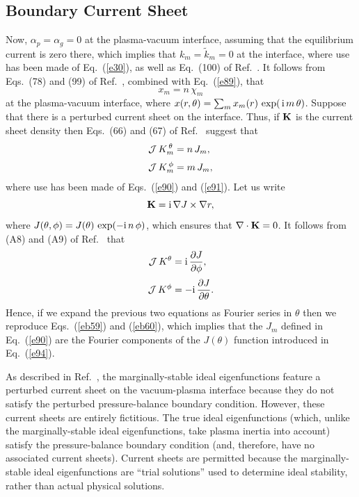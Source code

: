 \documentclass[12pt,prb,aps]{revtex4-1}
\begin{document}
\subsection{Boundary Current Sheet}
Now, $\alpha_p=\alpha_g=0$ at the plasma-vacuum interface, assuming that the  equilibrium current is zero there,
which implies that $k_m=\tilde{k}_m=0$ at the interface, where use has been made of Eq.~(\ref{e30}),
as well as Eq.~(100) of Ref.~.  It follows from Eqs.~(78) and (99) of Ref.~, combined with Eq.~(\ref{e89}),  that 
\begin{equation}\label{e91}
x_m= n\,\chi_m
\end{equation}
at the plasma-vacuum interface, where $x(r,\theta)=\sum_m x_m(r)\,\exp(\,{\rm i}\,m\,\theta)$. 
Suppose that there is a perturbed current sheet on the interface. 
Thus, if ${\bf K}$ is the current sheet density then Eqs.~(66) and (67) of Ref.~ suggest that
\begin{align}\label{eb59}
{\cal J}\,K_m^{\,\theta} &=  n\,J_m,\\[0.5ex]
{\cal J}\,K_m^{\,\phi} &=m\,J_m,\label{eb60}
\end{align}
where use has been made of Eqs.~(\ref{e90}) and (\ref{e91}). 
Let us write
\begin{equation}\label{e94}
{\bf K} = {\rm i}\,\nabla J\times \nabla r,
\end{equation}
where $J(\theta,\phi)=J(\theta)\,\exp(-{\rm i}\,n\,\phi)$, which ensures that $\nabla\cdot{\bf K}=0$. It follows from (A8) and (A9) of Ref.~ that
\begin{align}
{\cal J}\,K^\theta&= {\rm i}\,\frac{\partial J}{\partial \phi},\\[0.5ex]
{\cal J}\,K^\phi &=-{\rm i}\,\frac{\partial J}{\partial\theta}.
\end{align}
Hence, if we expand the previous two equations as Fourier series in $\theta$ then we reproduce Eqs.~(\ref{eb59}) and (\ref{eb60}), which implies
 that the $J_m$ defined in Eq.~(\ref{e90}) are the Fourier components of the $J(\theta)$ function introduced in Eq.~(\ref{e94}). 

As described in Ref.~, the marginally-stable ideal eigenfunctions   feature a perturbed current sheet on the vacuum-plasma interface because they do not satisfy the
perturbed  pressure-balance boundary condition.
However, these current sheets are entirely fictitious. The true ideal eigenfunctions (which, unlike the marginally-stable ideal eigenfunctions, take plasma inertia into account)
satisfy the pressure-balance boundary condition (and, therefore, have no associated current sheets). Current sheets are permitted because the marginally-stable ideal eigenfunctions
are ``trial solutions'' used to determine ideal stability, rather than actual physical solutions. 
\end{document}
